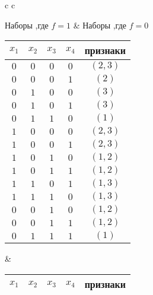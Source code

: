 \documentclass[12pt,a4paper]{article}
\begin{document}
\begin{table}[h!]
\begin{tabular}{c c}

	 Наборы ,где  $f = 1$ &  Наборы ,где  $f = 0$ \\
		\begin{tabular}{|c|c|c|c||c|}
			
			\hline
			$x_1$ & $x_2$ & $x_3$ & $x_4$ & признаки  \\
			\hline		
			
			$0$ & $0$ & $0$ & $0$ & $(2,3)$  \\
			\hline
			$0$ & $0$ & $0$ & $1$ & $(2)$  \\
			\hline
			$0$ & $1$ & $0$ & $0$ & $(3)$  \\
			\hline
			$0$ & $1$ & $0$ & $1$ & $(3)$  \\
			\hline
			$0$ & $1$ & $1$ & $0$ & $(1)$  \\
			\hline
			$1$ & $0$ & $0$ & $0$ & $(2,3)$  \\
			\hline
			$1$ & $0$ & $0$ & $1$ & $(2,3)$  \\
			\hline
			$1$ & $0$ & $1$ & $0$ & $(1,2)$ \\
			\hline
			$1$ & $0$ & $1$ & $1$ & $(1,2)$  \\
			\hline
			$1$ & $1$ & $0$ & $1$ & $(1,3)$ \\
			\hline
			$1$ & $1$ & $1$ & $0$ & $(1,3)$  \\
			\hline
			$0$ & $0$ & $1$ & $0$ & $(1,2)$  \\
			\hline
			$0$ & $0$ & $1$ & $1$ & $(1,2)$  \\
			\hline
			$0$ & $1$ & $1$ & $1$ & $(1)$  \\
			\hline
		\end{tabular}

&

		\begin{tabular}{|c|c|c|c||c|}
			\hline
			$x_1$ & $x_2$ & $x_3$ & $x_4$ & признаки  \\
			\hline		
			

\end{tabular}
\end{tabular}
\end{table}
\end{document}
